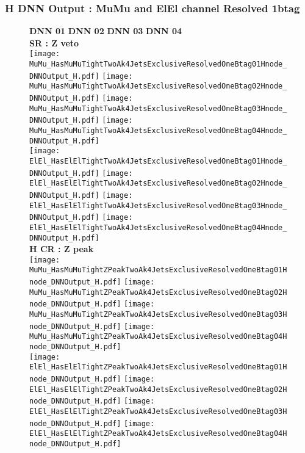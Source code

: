 \documentclass[9pt]{beamer}
\begin{document}
\begin{frame}
	\frametitle{H DNN Output : MuMu and ElEl channel Resolved 1btag}
	\begin{figure}
	    \textbf{DNN 01} \hspace{1.2cm} \textbf{DNN 02} \hspace{1.2cm} \textbf{DNN 03} \hspace{1.2cm} \textbf{DNN 04} \\
        \centering
        \textbf{SR : Z veto} \\
		\texttt{[image: MuMu\_HasMuMuTightTwoAk4JetsExclusiveResolvedOneBtag01Hnode\_DNNOutput\_H.pdf]}
		\texttt{[image: MuMu\_HasMuMuTightTwoAk4JetsExclusiveResolvedOneBtag02Hnode\_DNNOutput\_H.pdf]}
		\texttt{[image: MuMu\_HasMuMuTightTwoAk4JetsExclusiveResolvedOneBtag03Hnode\_DNNOutput\_H.pdf]}
		\texttt{[image: MuMu\_HasMuMuTightTwoAk4JetsExclusiveResolvedOneBtag04Hnode\_DNNOutput\_H.pdf]}\\
		\texttt{[image: ElEl\_HasElElTightTwoAk4JetsExclusiveResolvedOneBtag01Hnode\_DNNOutput\_H.pdf]}
		\texttt{[image: ElEl\_HasElElTightTwoAk4JetsExclusiveResolvedOneBtag02Hnode\_DNNOutput\_H.pdf]}
		\texttt{[image: ElEl\_HasElElTightTwoAk4JetsExclusiveResolvedOneBtag03Hnode\_DNNOutput\_H.pdf]}
		\texttt{[image: ElEl\_HasElElTightTwoAk4JetsExclusiveResolvedOneBtag04Hnode\_DNNOutput\_H.pdf]}\\
        \textbf{H CR : Z peak} \\
		\texttt{[image: MuMu\_HasMuMuTightZPeakTwoAk4JetsExclusiveResolvedOneBtag01Hnode\_DNNOutput\_H.pdf]}
		\texttt{[image: MuMu\_HasMuMuTightZPeakTwoAk4JetsExclusiveResolvedOneBtag02Hnode\_DNNOutput\_H.pdf]}
		\texttt{[image: MuMu\_HasMuMuTightZPeakTwoAk4JetsExclusiveResolvedOneBtag03Hnode\_DNNOutput\_H.pdf]}
		\texttt{[image: MuMu\_HasMuMuTightZPeakTwoAk4JetsExclusiveResolvedOneBtag04Hnode\_DNNOutput\_H.pdf]}\\
		\texttt{[image: ElEl\_HasElElTightZPeakTwoAk4JetsExclusiveResolvedOneBtag01Hnode\_DNNOutput\_H.pdf]}
		\texttt{[image: ElEl\_HasElElTightZPeakTwoAk4JetsExclusiveResolvedOneBtag02Hnode\_DNNOutput\_H.pdf]}
		\texttt{[image: ElEl\_HasElElTightZPeakTwoAk4JetsExclusiveResolvedOneBtag03Hnode\_DNNOutput\_H.pdf]}
		\texttt{[image: ElEl\_HasElElTightZPeakTwoAk4JetsExclusiveResolvedOneBtag04Hnode\_DNNOutput\_H.pdf]}\\
	\end{figure}
\end{frame}
\end{document}
